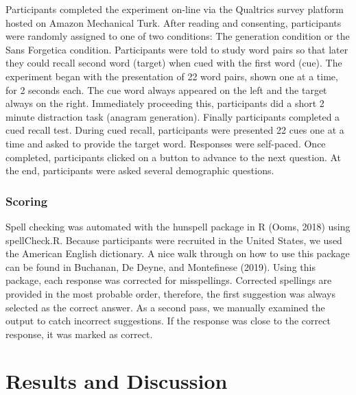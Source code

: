 \documentclass[english,pdf]{apa6}
\begin{document}
Participants completed the experiment on-line via the Qualtrics survey platform hosted on Amazon Mechanical Turk. After reading and consenting, participants were randomly assigned to one of two conditions: The generation condition or the Sans Forgetica condition. Participants were told to study word pairs so that later they could recall second word (target) when cued with the first word (cue). The experiment began with the presentation of 22 word pairs, shown one at a time, for 2 seconds each. The cue word always appeared on the left and the target always on the right. Immediately proceeding this, participants did a short 2 minute distraction task (anagram generation). Finally participants completed a cued recall test. During cued recall, participants were presented 22 cues one at a time and asked to provide the target word. Responses were self-paced. Once completed, participants clicked on a button to advance to the next question. At the end, participants were asked several demographic questions.

\hypertarget{scoring}{%
\subsubsection{Scoring}\label{scoring}}

Spell checking was automated with the hunspell package in R (Ooms, 2018) using spellCheck.R. Because participants were recruited in the United States, we used the American English dictionary. A nice walk through on how to use this package can be found in Buchanan, De Deyne, and Montefinese (2019). Using this package, each response was corrected for misspellings. Corrected spellings are provided in the most probable order, therefore, the first suggestion was always selected as the correct answer. As a second pass, we manually examined the output to catch incorrect suggestions. If the response was close to the correct response, it was marked as correct.

\hypertarget{results-and-discussion}{%
\section{Results and Discussion}\label{results-and-discussion}}
\end{document}
